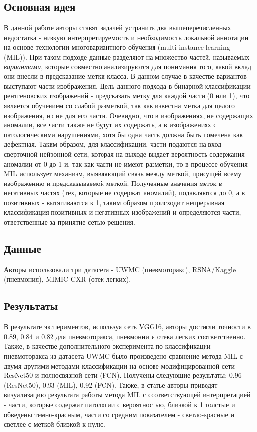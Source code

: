 \subsection*{Основная идея}
В данной работе авторы ставят задачей устранить два вышеперечисленных недостатка - 
низкую интерпретируемость и необходимость локальной аннотации на основе технологии многовариантного 
обучения (multi-instance learning (MIL)). При таком подходе данные разделяют на множество частей, 
называемых \textit{вариантами}, которые совместно анализируются для понимания того, какой вклад они 
внесли в предсказание метки класса. В данном случае в качестве вариантов выступают части изображения. 
Цель данного подхода в бинарной классификации рентгеновских изображений - предсказать метку для каждой части (0 или 1), 
что является обучением со слабой разметкой, так как известна метка для целого изображения, но не для его части.
 Очевидно, что в изображениях, не содержащих аномалий, все части также не будут их содержать, а в изображениях с 
 патологическими нарушениями, хотя бы одна часть должна быть помечена как дефектная. Таким образом, для классификации, 
 части подаются на вход сверточной нейронной сети, которая на выходе выдает вероятность содержания аномалии от 0 до 1 и, 
 так как части не имеют разметки, то в процессе обучения MIL использует механизм, выявляющий связь между меткой, 
 присущей всему изображению и предсказываемой меткой. Полученные значения меток в негативных частях (тех, которые не содержат аномалий), 
 подавляются до 0, а в позитивных - вытягиваются к 1, таким образом происходит непрерывная классификация позитивных и негативных 
 изображений и определяются части, ответственные за принятие сетью решения.
\subsection*{Данные}
Авторы использовали три датасета - UWMC (пневмоторакс), RSNA/Kaggle (пневмония), MIMIC-CXR (отек легких).\par 

\subsection*{Результаты}
В результате экспериментов, используя сеть VGG16, авторы достигли точности в 0.89, 0.84 и 0.82 для 
пневмоторакса, пневмонии и отека легких соответственно. Также, в качестве дополнительного эксперимента
 по классификации пневмоторакса из датасета UWMC было произведено сравнение метода MIL 
 с двумя другими методами классификации на основе модифицированной сети ResNet50 и 
 полносвязной сети (FCN). Получены следующие результаты: 0.96 (ResNet50), 0.93 (MIL), 0.92 (FCN). 
 Также, в статье авторы приводят визуализацию результата работы метода MIL с соответствующей интерпретацией - 
 части, которые содержат патологии с вероятностью, близкой к 1 толстые и обведены темно-красным, части со средним показателем - 
 светло-красные и светлее с меткой близкой к нулю.
